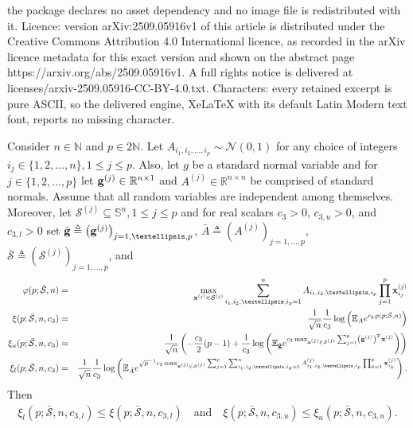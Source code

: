 \documentclass[10pt,a4paper]{amsart}
\def\bcS{\bar{\mathcal S}}
\def\cN{{\mathcal N}}
\def\cS{{\mathcal S}}
\def\g{{\bf g}}
\def\lp{\left (}
\def\mE{{\mathbb E}}
\def\mN{{\mathbb N}}
\def\mR{{\mathbb R}}
\def\mS{{\mathbb S}}
\def\rp{\right )}
\def\x{{\bf x}}
\begin{document}
the package declares no asset dependency and no image file is redistributed with it. Licence: version arXiv:2509.05916v1 of this article is distributed under the Creative Commons Attribution 4.0 International licence, as recorded in the arXiv licence metadata for this exact version and shown on the abstract page https://arxiv.org/abs/2509.05916v1. A full rights notice is delivered at licenses/arxiv-2509.05916-CC-BY-4.0.txt. Characters: every retained excerpt is pure ASCII, so the delivered engine, XeLaTeX with its default Latin Modern text font, reports no missing character.
\begin{theorem}
\label{thm:thm1}
  Consider  $n\in\mN$ and  $p\in 2\mN$. Let $A_{i_1,i_2,\dots,i_p}\sim \cN(0,1)$ for any choice of integers $i_j\in\{1,2,\dots,n\},1\leq j \leq p$. Also, let $g$ be a standard normal variable and for $j\in\{1,2,\dots,p\}$ let $\g^{(j)}\in \mR^{n\times 1}$ and $A^{(j)}\in \mR^{n\times n}$ be comprised of standard normals. Assume that all random variables are independent among themselves. Moreover, let $\cS^{(j)}\subseteq\mS^n, 1\leq j\leq p$ and for real scalars $c_3>0$, $c_{3,u}>0$, and $c_{3,l}>0$  set $\bar{\g}\triangleq\lp \g^{(j)}\rp_{j=1,\dots,p}$, $\bar{A}\triangleq\lp A^{(j)}\rp_{j=1,\dots,p}$, $\bcS\triangleq\lp \cS^{(j)}\rp_{j=1,\dots,p}$, and
  \begin{eqnarray}
   \label{eq:thm1eq1}
\varphi(p;\bcS,n) & = &  \max_{\x^{(j)}\in\cS^{(j)}} \sum_{i_1,i_2,\dots,i_p=1}^n A_{i_1,i_2,\dots,i_p}\prod_{j=1}^{p}\x_{i_j}^{(j)} \nonumber \\
\xi(p;\bcS,n,c_3) & = &  \frac{1}{\sqrt{n}} \frac{1}{c_3}\log \lp  \mE_A e^{c_3 \varphi(p;\bcS,n) } \rp \nonumber \\
\xi_u(p;\bcS,n,c_3) & = & \frac{1}{\sqrt{n}} \lp -\frac{c_{3}}{2}(p-1)  + \frac{1}{c_{3}} \log\lp  \mE_{\bar{\g}} e^{c_{3}\max_{\x^{(j)}\in\cS^{(j)}} \sum_{j=1}^p \lp\g^{(j)}\rp^T\x^{(j)} } \rp \rp
\nonumber \\
\xi_l(p;\bcS,n,c_3) & = &   \frac{1}{\sqrt{ n}} \frac{1}{c_{3}} \log \lp \mE_{\bar{A}} e^{ \sqrt{p}^{-1}c_{3} \max_{\x^{(j)}\in\cS^{(j)}} \sum_{j=1}^p \sum_{i_1,i_2,\dots,i_p=1}^n A^{(j)}_{i_1,i_2,\dots,i_p}\prod_{k=1}^{p}\x_{i_k}^{(j)}
 } \rp.
 \end{eqnarray}
Then
\begin{eqnarray}
   \label{eq:thm1eq2}
\xi_l(p;\bcS,n,c_{3,l})  \leq \xi(p;\bcS,n,c_{3,l}) \quad \mbox{and} \quad  \xi(p;\bcS,n,c_{3,u})   \leq  \xi_u(p;\bcS,n,c_{3,u}).
\end{eqnarray}
\end{theorem}
\end{document}
